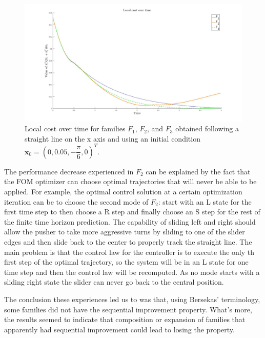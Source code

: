 \documentclass[12,twoside]{TFG-GM}
\theoremstyle{definition}
\theoremstyle{remark}
\begin{document}
\begin{figure}[htb!]
\begin{center}
\includegraphics[width=16cm]{non_chameleon.jpg}
\end{center}
\caption{\label{fig:non_chameleon} \small Local cost over time for families $F_1$, $F_2$, and $F_3$ obtained following a straight line on the x axis and using an initial condition $\textbf{x}_0 = (0, 0.05, - \dfrac{\pi}{6}, 0)^T$.}
\end{figure}

The performance decrease experienced in $F_2$ can be explained by the fact that the FOM optimizer can choose optimal trajectories that will never be able to be applied. For example, the optimal control solution at a certain optimization iteration can be to choose the second mode of $F_2$: start with an L state for the first time step to then choose a R step and finally choose an S step for the rest of the finite time horizon prediction. The capability of sliding left and right should allow the pusher to take more aggressive turns by sliding to one of the slider edges and then slide back to the center to properly track the straight line. The main problem is that the control law for the controller is to execute the only th first step of the optimal trajectory, so the system will be in an L state for one time step and then the control law will be recomputed. As no mode starts with a sliding right state the slider can never go back to the central position.

The conclusion these experiences led us to was that, using Bersekas' terminology, some families did not have the sequential improvement property. What's more, the results seemed to indicate that composition or expansion of families that apparently had sequential improvement could lead to losing the property.
\end{document}
